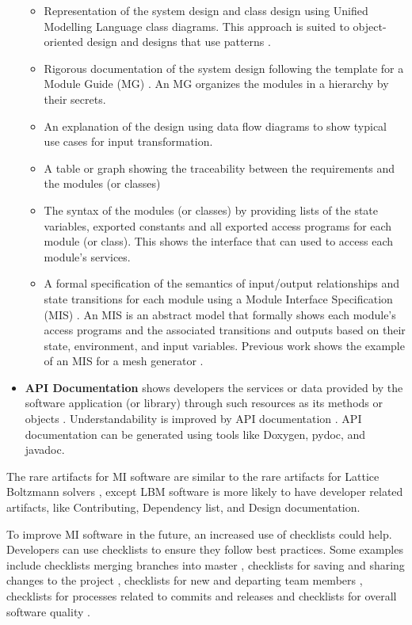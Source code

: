 \documentclass[11pt]{article}
\begin{document}
\begin{itemize}
\begin{itemize}
	\item Representation of the system design and class design using Unified
	Modelling Language class diagrams. This approach is suited to
	object-oriented design and designs that use patterns \cite{Gamma1995}.
	\item Rigorous documentation of the system design following the template for
	a Module Guide (MG) \cite{ParnasEtAl1984}.  An MG organizes the modules in
	a hierarchy by their secrets.
	\item An explanation of the design using data flow diagrams to show typical use cases
	for input transformation.
	\item A table or graph showing the traceability between the requirements and
	the modules (or classes)
	\item The syntax of the modules (or classes) by providing lists of the state
	variables, exported constants and all exported access programs for each
	module (or class).  This shows the interface that can used to access each
	module's services.
	\item A formal specification of the semantics of input/output relationships
	and state transitions for each module using a Module Interface Specification
	(MIS) \cite{HoffmanAndStrooper1995}. An MIS is an abstract model that
	formally shows each module's access programs and the associated transitions
	and outputs based on their state, environment, and input variables.
	Previous work shows the example of an MIS for a mesh generator
	\cite{ElSheikhEtAl2004, SmithAndYu2009}.
\end{itemize}

\item \textbf{API Documentation} shows developers the services or data provided
by the software application (or library) through such resources as its methods
or objects \cite{MengEtAl2018}.  Understandability is improved by API
documentation \cite{MengEtAl2018}. API documentation can be generated using
tools like Doxygen, pydoc, and javadoc.

\end{itemize}

The rare artifacts for MI software are similar to the rare artifacts for Lattice
Boltzmann solvers \cite{Michalski2021}, except LBM software is more likely to
have developer related artifacts, like Contributing, Dependency list, and Design
documentation.

To improve MI software in the future, an increased use of checklists could help.
Developers can use checklists to ensure they follow best practices.  Some
examples include checklists merging branches into master \cite{Brown2015},
checklists for saving and sharing changes to the project \cite{WilsonEtAl2016},
checklists for new and departing team members \cite{HerouxAndBernholdt2018},
checklists for processes related to commits and releases \cite{HerouxEtAl2008}
and checklists for overall software quality \cite{ThielEtAl2020, SSI2022}.
\end{document}
